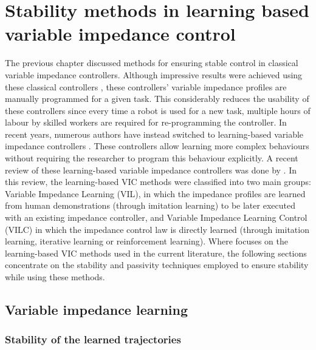 \chapter{Stability methods in learning based variable impedance control}
\label{chapter:learning_based_variable_impedance}


The previous chapter discussed methods for ensuring stable control in classical variable impedance controllers. Although impressive results were achieved using these classical controllers \cite{songTutorialSurveyComparison2019}, these controllers' variable impedance profiles are manually programmed for a given task. This considerably reduces the usability of these controllers since every time a robot is used for a new task, multiple hours of labour by skilled workers are required for re-programming the controller. In recent years, numerous authors have instead switched to learning-based variable impedance controllers \cite{abu-dakkaVariableImpedanceControl2020}. These controllers allow learning more complex behaviours without requiring the researcher to program this behaviour explicitly. A recent review of these learning-based variable impedance controllers was done by \cite{abu-dakkaVariableImpedanceControl2020}. In this review, the learning-based VIC methods were classified into two main groups: Variable Impedance Learning (VIL), in which the impedance profiles are learned from human demonstrations (through imitation learning) to be later executed with an existing impedance controller, and Variable Impedance Learning Control (VILC) in which the impedance control law is directly learned (through imitation learning, iterative learning or reinforcement learning). Where \cite{abu-dakkaVariableImpedanceControl2020} focuses on the learning-based VIC methods used in the current literature, the following sections concentrate on the stability and passivity techniques employed to ensure stability while using these methods.

\section{Variable impedance learning}

\subsection{Stability of the learned trajectories}

